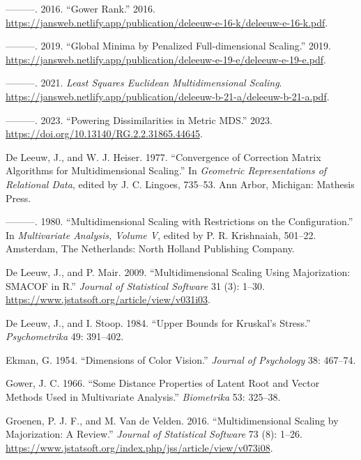 \documentclass[
  12pt,
]{article}
\newlength{\cslhangindent}
\newenvironment{CSLReferences}[2] %
 {\begin{list}{}{%
  \setlength{\itemindent}{0pt}
  \setlength{\leftmargin}{0pt}
  \setlength{\parsep}{0pt}
  \ifodd #1
   \setlength{\leftmargin}{\cslhangindent}
   \setlength{\itemindent}{-1\cslhangindent}
  \fi
  \setlength{\itemsep}{#2\baselineskip}}}
 {\end{list}}
\begin{document}
\begin{CSLReferences}{1}{0}
---------. 2016. {``Gower Rank.''} 2016. \url{https://jansweb.netlify.app/publication/deleeuw-e-16-k/deleeuw-e-16-k.pdf}.

---------. 2019. {``{Global Minima by Penalized Full-dimensional Scaling}.''} 2019. \url{https://jansweb.netlify.app/publication/deleeuw-e-19-e/deleeuw-e-19-e.pdf}.

---------. 2021. \emph{Least Squares Euclidean Multidimensional Scaling}. \url{https://jansweb.netlify.app/publication/deleeuw-b-21-a/deleeuw-b-21-a.pdf}.

---------. 2023. {``Powering Dissimilarities in Metric MDS.''} 2023. \url{https://doi.org/10.13140/RG.2.2.31865.44645}.

De Leeuw, J., and W. J. Heiser. 1977. {``Convergence of Correction Matrix Algorithms for Multidimensional Scaling.''} In \emph{Geometric Representations of Relational Data}, edited by J. C. Lingoes, 735--53. Ann Arbor, Michigan: Mathesis Press.

---------. 1980. {``Multidimensional Scaling with Restrictions on the Configuration.''} In \emph{Multivariate Analysis, Volume {V}}, edited by P. R. Krishnaiah, 501--22. Amsterdam, The Netherlands: North Holland Publishing Company.

De Leeuw, J., and P. Mair. 2009. {``{Multidimensional Scaling Using Majorization: SMACOF in R}.''} \emph{Journal of Statistical Software} 31 (3): 1--30. \url{https://www.jstatsoft.org/article/view/v031i03}.

De Leeuw, J., and I. Stoop. 1984. {``Upper Bounds for Kruskal's Stress.''} \emph{Psychometrika} 49: 391--402.

Ekman, G. 1954. {``{Dimensions of Color Vision}.''} \emph{Journal of Psychology} 38: 467--74.

Gower, J. C. 1966. {``{Some Distance Properties of Latent Root and Vector Methods Used in Multivariate Analysis}.''} \emph{Biometrika} 53: 325--38.

Groenen, P. J. F., and M. Van de Velden. 2016. {``{Multidimensional Scaling by Majorization: A Review}.''} \emph{Journal of Statistical Software} 73 (8): 1--26. \url{https://www.jstatsoft.org/index.php/jss/article/view/v073i08}.


\end{CSLReferences}
\end{document}
